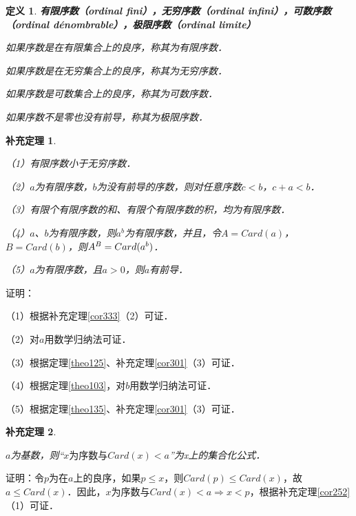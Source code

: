 \documentclass[12pt, a4paper, oneside]{book}
\newtheorem{cor}{补充定理}
\newtheorem{de}{定义}
\begin{document}
			\begin{de}
				\textbf{有限序数（ordinal fini），无穷序数（ordinal infini），可数序数（ordinal dénombrable），极限序数（ordinal limite）}
				\par
				如果序数是在有限集合上的良序，称其为有限序数．
				\par
				如果序数是在无穷集合上的良序，称其为无穷序数．
				\par
				如果序数是可数集合上的良序，称其为可数序数．
				\par
				如果序数不是零也没有前导，称其为极限序数．
			\end{de}
			
			\begin{cor}\label{cor339}
				\hfill\par
				（1）有限序数小于无穷序数．
				\par
				（2）$a$为有限序数，$b$为没有前导的序数，则对任意序数$c<b$，$c+a<b$．
				\par
				（3）有限个有限序数的和、有限个有限序数的积，均为有限序数．
				\par
				（4）$a$、$b$为有限序数，则$a^b$为有限序数，并且，令$A=Card(a)$，$B= Card(b)$，则$A^B\\=Card(a^b)$．
				\par
				（5）$a$为有限序数，且$a>0$，则$a$有前导．
			\end{cor}
			证明：
			\par
			（1）根据补充定理\ref{cor333}（2）可证．
			\par
			（2）对$a$用数学归纳法可证．
			\par
			（3）根据定理\ref{theo125}、补充定理\ref{cor301}（3）可证．
			\par
			（4）根据定理\ref{theo103}，对$b$用数学归纳法可证．
			\par
			（5）根据定理\ref{theo135}、补充定理\ref{cor301}（3）可证．
			
			\begin{cor}\label{cor340}
				\hfill\par
				$a$为基数，则“$x\text{为序数}\text{与}Card(x)<a$”为x上的集合化公式．
			\end{cor}
			证明：令$p$为在$a$上的良序，如果$p\leq x$，则$Card(p)\leq Card(x)$，故$a\leq Card(x)$．因此，$x\text{为序数}\text{与}Card(x)<a\Rightarrow x<p$，根据补充定理\ref{cor252}（1）可证．
			
\end{document}
